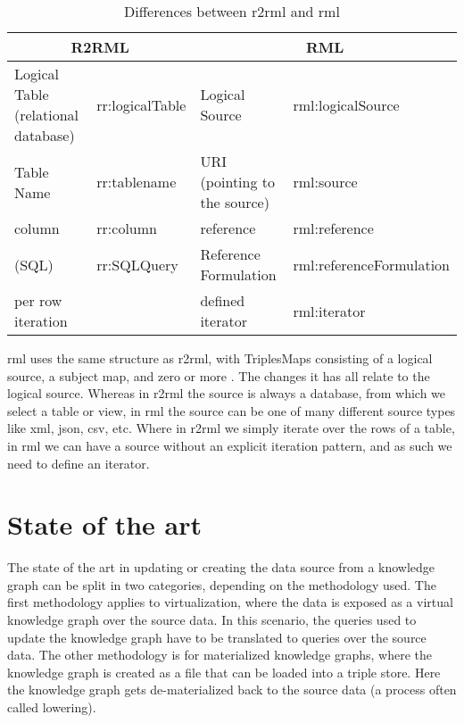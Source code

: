 \begin{table}[]
    \begin{tabular}{|ll|ll|}
    \hline
    \multicolumn{2}{|c|}{R2RML}                           & \multicolumn{2}{c|}{RML}                                            \\ \hline
    Logical Table (relational database) & rr:logicalTable & Logical Source                           & rml:logicalSource        \\ \hline
    Table Name                          & rr:tablename    & URI (pointing to the source)             & rml:source               \\ \hline
    column                              & rr:column       & reference                                & rml:reference            \\ \hline
    (SQL)                               & rr:SQLQuery     & Reference Formulation                    & rml:referenceFormulation \\ \hline
    per row iteration                   &                 & defined iterator                         & rml:iterator             \\ \hline
    \end{tabular}
    \caption{Differences between \acrshort{r2rml} and \acrshort{rml}}
    \label{tab:r2rml_rml_differences}
\end{table}

\acrshort{rml} uses the same structure as \acrshort{r2rml}, with TriplesMaps consisting of a logical source, a subject map, and zero or more . The changes it has all relate to the logical source. Whereas in \acrshort{r2rml} the source is always a database, from which we select a table or view, in \acrshort{rml} the source can be one of many different source types like \acrshort{xml}, \acrshort{json}, \acrshort{csv}, etc. Where in \acrshort{r2rml} we simply iterate over the rows of a table, in \acrshort{rml} we can have a source without an explicit iteration pattern, and as such we need to define an iterator. 


\section{State of the art}
The state of the art in updating or creating the data source from a knowledge graph can be split in two categories, depending on the methodology used. The first methodology applies to virtualization, where the data is exposed as a virtual knowledge graph over the source data. In this scenario, the queries used to update the knowledge graph have to be translated to queries over the source data. The other methodology is for materialized knowledge graphs, where the knowledge graph is created as a file that can be loaded into a triple store. Here the knowledge graph gets de-materialized back to the source data (a process often called lowering).

